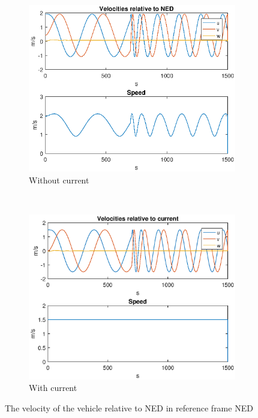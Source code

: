 \begin{figure}[!ht]
	\centering
	\begin{subfigure}[b]{0.45\textwidth}
		\includegraphics[width=\textwidth]{figures/2_6_vel_ned}
		\caption{Without current}
	\end{subfigure}
	~ %
	\begin{subfigure}[b]{0.45\textwidth}
		\includegraphics[width=\textwidth]{figures/2_6_vel_cur}
		\caption{With current}
	\end{subfigure}
	\caption{The velocity of the vehicle relative to NED  in reference frame NED}
	\label{fig:2_6_vel}
\end{figure}


